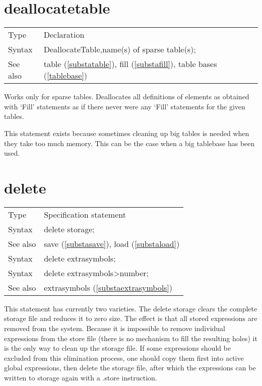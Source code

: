  
\section{deallocatetable}
\label{substadeallocatetable}

\noindent \begin{tabular}{ll}
Type & Declaration\\
Syntax & DeallocateTable,name(s) of sparse table(s);
\\ See also & table (\ref{substatable}), fill (\ref{substafill}),
   table bases (\ref{tablebase})
\end{tabular} \vspace{4mm}

\noindent Works only for sparse 
tables. Deallocates all definitions of elements as 
obtained with `Fill' statements as if there never were any 
`Fill' statements for the given tables.

This statement exists because sometimes cleaning up big tables is needed 
when they take too much memory. This can be the case when a big tablebase 
has been used. \vspace{10mm}


\section{delete}
\label{substadelete}

\noindent \begin{tabular}{ll}
Type & Specification statement\\
Syntax & delete storage; \\
See also & save (\ref{substasave}), load (\ref{substaload}) \\
Syntax & delete extrasymbols; \\
Syntax & delete extrasymbols\textgreater{}number; \\
See also & extrasymbols (\ref{substaextrasymbols}) \\

\end{tabular} \vspace{4mm}

\noindent This statement has currently two varieties. The delete 
storage clears the complete storage 
file and reduces it to zero size. The effect is that 
all stored expressions are removed from the system. Because it is 
impossible to remove individual expressions from the store file (there is 
no mechanism to fill the resulting holes) it is the only way to clean up 
the storage file. If some expressions should be excluded from this 
elimination process, one should copy them first into active global 
expressions, then delete the storage file, after which the expressions can 
be written to storage again with a .store instruction.

